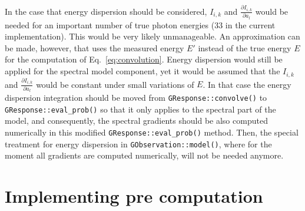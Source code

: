 \documentclass{article}[12pt,a4]
\begin{document}
In the case that energy dispersion should be considered, $I_{i,k}$ and $\frac{\partial I_{i,k}}{\partial a_l}$
would be needed for an important number of true photon energies (33 in the current implementation).
This would be very likely unmanageable.
An approximation can be made, however, that uses the measured energy $E'$ instead of the true
energy $E$ for the computation of Eq.~\ref{eq:convolution}.
Energy dispersion would still be applied for the spectral model component, yet it would be assumed
that the $I_{i,k}$ and $\frac{\partial I_{i,k}}{\partial a_l}$ would be constant under small variations of $E$.
In that case the energy dispersion integration should be moved from {\tt GResponse::convolve()} to
{\tt GResponse::eval\_prob()} so that it only applies to the spectral part of the model, and consequently,
the spectral gradients should be also computed numerically in this modified {\tt GResponse::eval\_prob()}
method.
Then, the special treatment for energy dispersion in {\tt GObservation::model()}, where for the moment all
gradients are computed numerically, will not be needed anymore.


\section{Implementing pre computation}
\end{document}

